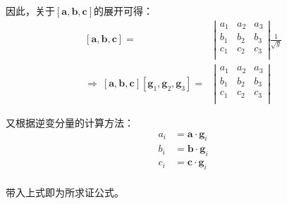 \documentclass[UTF8,zihao=5]{ctexart}
\newcommand{\bm}[1]{{\mathbf{#1}}}
\begin{document}
因此，关于$[\bm{a},\bm{b},\bm{c}]$的展开可得：
\begin{equation*}
    \begin{aligned}
        [\bm{a},\bm{b},\bm{c}]
        =&\left|
            \begin{matrix}
                a_1 &a_2 &a_3\\
                b_1 &b_2 &b_3\\
                c_1 &c_2 &c_3\\
            \end{matrix}
        \right|\frac{1}{\sqrt{g}}\\
        \Rightarrow\ 
        [\bm{a},\bm{b},\bm{c}][\bm{g}_1,\bm{g}_2,\bm{g}_3]
        =&\left|
            \begin{matrix}
                a_1 &a_2 &a_3\\
                b_1 &b_2 &b_3\\
                c_1 &c_2 &c_3\\
            \end{matrix}
        \right|
    \end{aligned}
\end{equation*}

又根据逆变分量的计算方法：
\begin{equation*}
    \begin{aligned}
        a_i&=\bm{a}\cdot\bm{g}_i\\
        b_i&=\bm{b}\cdot\bm{g}_i\\
        c_i&=\bm{c}\cdot\bm{g}_i\\
    \end{aligned}
\end{equation*}

带入上式即为所求证公式。
\end{document}
